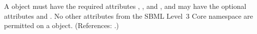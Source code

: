 A \Unit object must have the required attributes ,
,  and , and may have the
optional attributes  and .  No other
attributes from the SBML Level~3 Core namespace are permitted on a \Unit
object.  (References: .)
